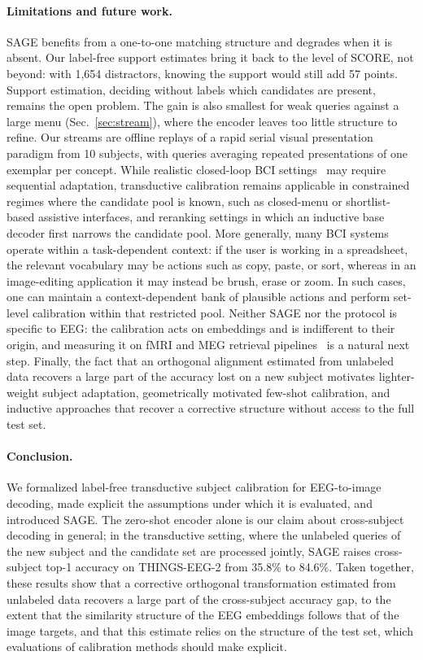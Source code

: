 \documentclass[10pt,twocolumn,letterpaper]{article}
\begin{document}
\paragraph{Limitations and future work.}
SAGE benefits from a one-to-one matching structure and degrades when it is absent. Our label-free support estimates bring it back to the level of SCORE, not beyond: with 1{,}654 distractors, knowing the support would still add 57 points. Support estimation, \ie deciding without labels which candidates are present, remains the open problem. The gain is also smallest for weak queries against a large menu (Sec.~\ref{sec:stream}), where the encoder leaves too little structure to refine. Our streams are offline replays of a rapid serial visual presentation paradigm from 10 subjects, with queries averaging repeated presentations of one exemplar per concept. While realistic closed-loop BCI settings~\cite{lawhern2018eegnet} may require sequential adaptation, transductive calibration remains applicable in constrained regimes where the candidate pool is known, such as closed-menu or shortlist-based assistive interfaces, and reranking settings in which an inductive base decoder first narrows the candidate pool. More generally, many BCI systems operate within a task-dependent context: if the user is working in a spreadsheet, the relevant vocabulary may be actions such as copy, paste, or sort, whereas in an image-editing application it may instead be brush, erase or zoom. In such cases, one can maintain a context-dependent bank of plausible actions and perform set-level calibration within that restricted pool. Neither SAGE nor the protocol is specific to EEG: the calibration acts on embeddings and is indifferent to their origin, and measuring it on fMRI and MEG retrieval pipelines~\cite{scotti2024mindeye2,hebart2025thingsmeg} is a natural next step. Finally, the fact that an orthogonal alignment estimated from unlabeled data recovers a large part of the accuracy lost on a new subject motivates lighter-weight subject adaptation, geometrically motivated few-shot calibration, and inductive approaches that recover a corrective structure without access to the full test set.

\paragraph{Conclusion.}
We formalized label-free transductive subject calibration for EEG-to-image decoding, made explicit the assumptions under which it is evaluated, and introduced SAGE. The zero-shot encoder alone is our claim about cross-subject decoding in general; in the transductive setting, where the unlabeled queries of the new subject and the candidate set are processed jointly, SAGE raises cross-subject top-1 accuracy on THINGS-EEG-2 from 35.8\% to 84.6\%. Taken together, these results show that a corrective orthogonal transformation estimated from unlabeled data recovers a large part of the cross-subject accuracy gap, to the extent that the similarity structure of the EEG embeddings follows that of the image targets, and that this estimate relies on the structure of the test set, which evaluations of calibration methods should make explicit.
\end{document}
